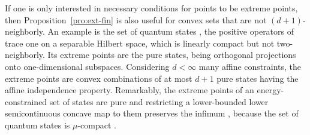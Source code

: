 \documentclass[a4paper,11pt,reqno]{amsart}
\numberwithin{equation}{section}
\theoremstyle{plain}
\theoremstyle{definition}
\begin{document}
%
If one is only interested in necessary conditions for points to be extreme points, 
then Proposition~\ref{pro:ext-fin} is also useful for convex sets that are not 
$(d+1)$-neighborly. An example is the set of quantum states 
\cite{alfsen-shultz01,aubrun-szarek17,bengtsson-zyczkowski17}, the positive operators 
of trace one on a separable Hilbert space, which is linearly compact but not 
two-neighborly. Its extreme points are the pure states, being orthogonal projections 
onto one-dimensional subspaces. Considering $d<\infty$ many affine constraints, the 
extreme points are convex combinations of at most $d+1$ pure states having the affine 
independence property. Remarkably, the extreme points of an energy-constrained set of 
states are pure and restricting a lower-bounded lower semicontinuous concave map 
to them preserves the infimum \cite{weis-shirokov21}, because the set of quantum states 
is $\mu$-compact \cite{holevo-shirokov06,protasov-shirokov2009}. 
\par
% 
%
\end{document}
